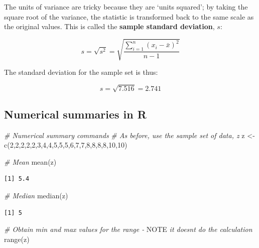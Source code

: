 \documentclass[
  oneside]{krantz}
\newenvironment{Shaded}{\begin{snugshade}}{\end{snugshade}}
\newcommand{\AlertTok}[1]{\textcolor[rgb]{0.94,0.16,0.16}{#1}}
\newcommand{\CommentTok}[1]{\textcolor[rgb]{0.56,0.35,0.01}{\textit{#1}}}
\newcommand{\DecValTok}[1]{\textcolor[rgb]{0.00,0.00,0.81}{#1}}
\newcommand{\FunctionTok}[1]{\textcolor[rgb]{0.00,0.00,0.00}{#1}}
\newcommand{\NormalTok}[1]{#1}
\newcommand{\OtherTok}[1]{\textcolor[rgb]{0.56,0.35,0.01}{#1}}
\begin{document}
The units of variance are tricky because they are `units squared'; by taking the square root of the variance, the statistic is transformed back to the same scale as the original values. This is called the \textbf{sample standard deviation}, \(s\):

\[s = \sqrt{s^2} = \sqrt{\frac{\sum_{i=1}^n{(x_i - \bar x)^2}}{n-1}} \]

The standard deviation for the sample set is thus:

\[s = \sqrt{7.516} = 2.741\]

\hypertarget{numerical-summaries-in-r}{%
\subsection{Numerical summaries in R}\label{numerical-summaries-in-r}}

\begin{Shaded}
\begin{Highlighting}[]
\CommentTok{\# Numerical summary commands }
\CommentTok{\# As before, use the sample set of data, z}
\NormalTok{z }\OtherTok{\textless{}{-}} \FunctionTok{c}\NormalTok{(}\DecValTok{2}\NormalTok{,}\DecValTok{2}\NormalTok{,}\DecValTok{2}\NormalTok{,}\DecValTok{2}\NormalTok{,}\DecValTok{2}\NormalTok{,}\DecValTok{3}\NormalTok{,}\DecValTok{4}\NormalTok{,}\DecValTok{4}\NormalTok{,}\DecValTok{5}\NormalTok{,}\DecValTok{5}\NormalTok{,}\DecValTok{5}\NormalTok{,}\DecValTok{6}\NormalTok{,}\DecValTok{7}\NormalTok{,}\DecValTok{7}\NormalTok{,}\DecValTok{8}\NormalTok{,}\DecValTok{8}\NormalTok{,}\DecValTok{8}\NormalTok{,}\DecValTok{8}\NormalTok{,}\DecValTok{10}\NormalTok{,}\DecValTok{10}\NormalTok{)}

\CommentTok{\# Mean}
\FunctionTok{mean}\NormalTok{(z)}
\end{Highlighting}
\end{Shaded}

\begin{verbatim}
[1] 5.4
\end{verbatim}

\begin{Shaded}
\begin{Highlighting}[]
\CommentTok{\# Median}
\FunctionTok{median}\NormalTok{(z)}
\end{Highlighting}
\end{Shaded}

\begin{verbatim}
[1] 5
\end{verbatim}

\begin{Shaded}
\begin{Highlighting}[]
\CommentTok{\# Obtain min and max values for the range {-} }\AlertTok{NOTE}\CommentTok{ it doesn\textquotesingle{}t do the calculation}
\FunctionTok{range}\NormalTok{(z)}
\end{Highlighting}
\end{Shaded}
\end{document}
